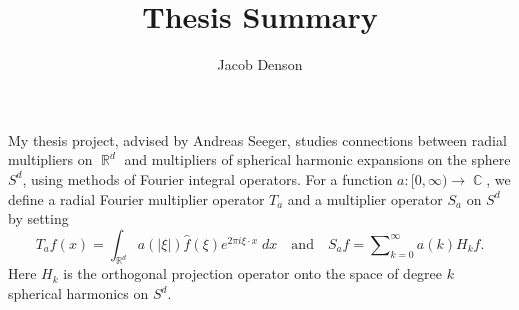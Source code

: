 \documentclass[11pt]{article}
\title{\vspace{-2em}Thesis Summary}
\author{Jacob Denson}
\date{}
\DeclareMathOperator{\RR}{\mathbb{R}}
\DeclareMathOperator{\CC}{\mathbb{C}}
\begin{document}
\maketitle

My thesis project, advised by Andreas Seeger, studies connections between radial multipliers on $\RR^d$ and multipliers of spherical harmonic expansions on the sphere $S^d$, using methods of Fourier integral operators. For a function $a: [0,\infty) \to \CC$, we define a radial Fourier multiplier operator $T_a$ and a multiplier operator $S_a$ on $S^d$ by setting
%
\[ T_af(x) = \int_{\RR^d} a(|\xi|) \widehat{f}(\xi) e^{2 \pi i \xi \cdot x}\; dx \quad\text{and}\quad S_a f = \sum\nolimits_{k = 0}^\infty a(k) H_k f. \]
%
Here $H_k$ is the orthogonal projection operator onto the space of degree $k$ spherical harmonics on $S^d$.
\end{document}
